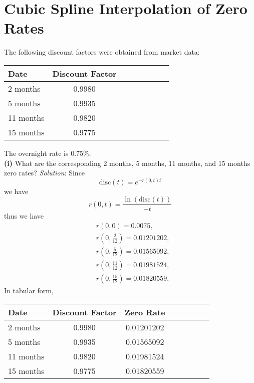 \documentclass[paper=a4, fontsize=11pt]{scrartcl} %
\numberwithin{equation}{section} %
\numberwithin{figure}{section} %
\numberwithin{table}{section} %
\begin{document}
\section{Cubic Spline Interpolation of Zero Rates}
The following discount factors were obtained from market data:

\begin{center}
\begin{tabular}{l*{6}{c}r}
Date              & Discount Factor \\
\hline
2 months & 0.9980 \\
5 months            & 0.9935   \\
11 months          & 0.9820   \\
15 months     & 0.9775   \\
\end{tabular}
\end{center}
The overnight rate is $0.75\%$.\\
\newline
\textbf{(i)} What are the corresponding 2 months, 5 months, 11 months, and 15 months zero rates?
\textit{Solution}: Since
$$
\text{disc}(t) = e^{-r(0,t)t}
$$
we have
$$
r(0,t) = \frac{\ln\left(\text{disc}(t)\right)}{-t}
$$
thus we have
\begin{equation}
\begin{split}
\nonumber &r\left(0,0\right) = 0.0075,\\
&r\left(0,\frac{2}{12}\right) = 0.01201202, \\
&r\left(0,\frac{5}{12}\right) = 0.01565092, \\
&r\left(0,\frac{11}{12}\right) = 0.01981524, \\
&r\left(0,\frac{15}{12}\right) = 0.01820559.
\end{split}
\end{equation}
In tabular form,
\begin{center}
\begin{tabular}{l*{6}{c}r}
Date              & Discount Factor & Zero Rate \\
\hline
2 months & 0.9980 & 0.01201202 \\
5 months            & 0.9935 & 0.01565092 \\
11 months          & 0.9820  & 0.01981524 \\
15 months     & 0.9775  & 0.01820559 \\
\end{tabular}
\end{center}
\end{document}
